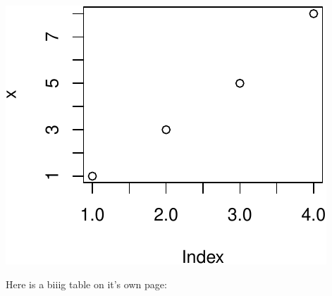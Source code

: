 \documentclass[12pt,preprint, authoryear]{article}
\numberwithin{equation}{section}
\numberwithin{figure}{section}
\numberwithin{table}{section}
\begin{document}
\begin{center}\includegraphics[width=0.4\linewidth]{final-article-template_files/figure-latex/unnamed-chunk-2-1} \end{center}

\newpage

Here is a biiig table on it's own page:

\scriptsize
\end{document}

